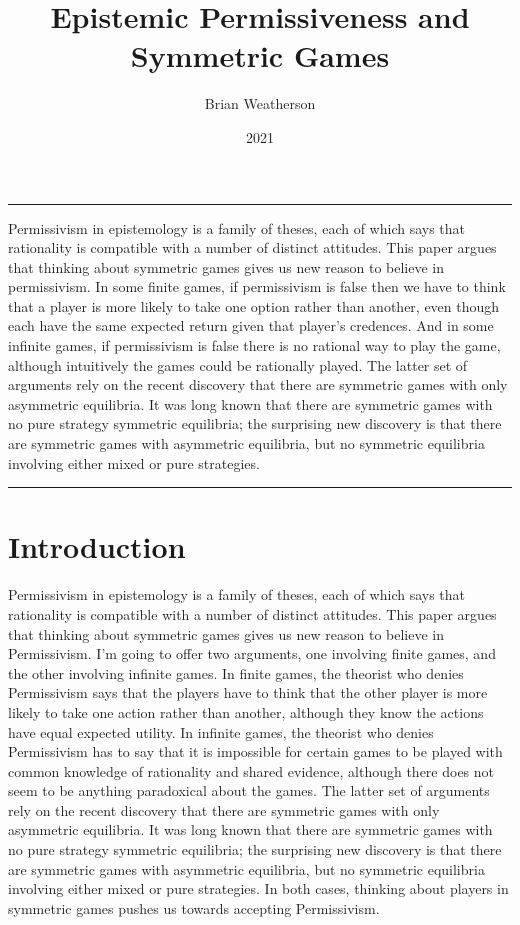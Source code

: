 \documentclass[
  10pt,
  letterpaper,
  DIV=11,
  numbers=noendperiod,
  twoside]{scrartcl}
\title{Epistemic Permissiveness and Symmetric Games}
\author{Brian Weatherson}
\date{2021}
\renewenvironment{abstract}
 {\vspace{-1.25cm}
 \quotation\small\noindent\rule{\linewidth}{.5pt}\par\smallskip
 \noindent }
 {\par\noindent\rule{\linewidth}{.5pt}\endquotation}
\begin{document}
\maketitle
\begin{abstract}
Permissivism in epistemology is a family of theses, each of which says
that rationality is compatible with a number of distinct attitudes. This
paper argues that thinking about symmetric games gives us new reason to
believe in permissivism. In some finite games, if permissivism is false
then we have to think that a player is more likely to take one option
rather than another, even though each have the same expected return
given that player's credences. And in some infinite games, if
permissivism is false there is no rational way to play the game,
although intuitively the games could be rationally played. The latter
set of arguments rely on the recent discovery that there are symmetric
games with only asymmetric equilibria. It was long known that there are
symmetric games with no pure strategy symmetric equilibria; the
surprising new discovery is that there are symmetric games with
asymmetric equilibria, but no symmetric equilibria involving either
mixed or pure strategies.
\end{abstract}


\section{Introduction}\label{introduction}

Permissivism in epistemology is a family of theses, each of which says
that rationality is compatible with a number of distinct attitudes. This
paper argues that thinking about symmetric games gives us new reason to
believe in Permissivism. I'm going to offer two arguments, one involving
finite games, and the other involving infinite games. In finite games,
the theorist who denies Permissivism says that the players have to think
that the other player is more likely to take one action rather than
another, although they know the actions have equal expected utility. In
infinite games, the theorist who denies Permissivism has to say that it
is impossible for certain games to be played with common knowledge of
rationality and shared evidence, although there does not seem to be
anything paradoxical about the games. The latter set of arguments rely
on the recent discovery that there are symmetric games with only
asymmetric equilibria. It was long known that there are symmetric games
with no pure strategy symmetric equilibria; the surprising new discovery
is that there are symmetric games with asymmetric equilibria, but no
symmetric equilibria involving either mixed or pure strategies. In both
cases, thinking about players in symmetric games pushes us towards
accepting Permissivism.
\end{document}
